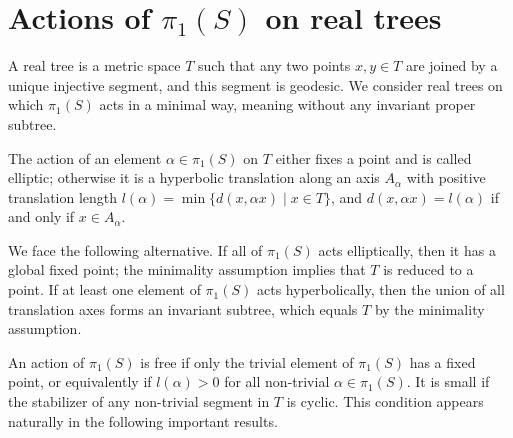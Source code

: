 \documentclass{amsart}
\newcommand{\C}{\mathbb{C}}
\newcommand{\R}{\mathbb{R}}
\newcommand{\ML}{\mathrm{ML}}
\newcommand{\Oo}{\mathcal{O}}
\DeclareMathOperator{\Hom}{Hom}
\begin{document}

\section{Actions of $\pi_1(S)$ on real trees}
\label{sectiontrees}


A real tree is a metric space $T$ such that any two points $x,y\in T$ are joined by a unique injective segment, and this segment is geodesic.
%
We consider real trees on which $\pi_1(S)$ acts in a minimal way, meaning without any invariant proper subtree.

The action of an element $\alpha\in \pi_1(S)$ on $T$ either fixes a point and is called elliptic; otherwise it is a hyperbolic translation along an axis $A_\alpha$ with positive translation length $l(\alpha)=\min\{d(x,\alpha x)\mid x\in T\}$, and $d(x,\alpha x)=l(\alpha)$ if and only if $x\in A_\alpha$. 

We face the following alternative. If all of $\pi_1(S)$ acts elliptically, then it has a global fixed point; the minimality assumption implies that $T$ is reduced to a point. If at least one element of $\pi_1(S)$ acts hyperbolically, then the union of all translation axes forms an invariant subtree, which equals $T$ by the minimality assumption.

An action of $\pi_1(S)$ is free if only the trivial element of $\pi_1(S)$ has a fixed point, or equivalently if $l(\alpha)>0$ for all non-trivial $\alpha\in \pi_1(S)$. It is small if the stabilizer of any non-trivial segment in $T$ is cyclic. This condition appears naturally in the following important results. 
\end{document}
